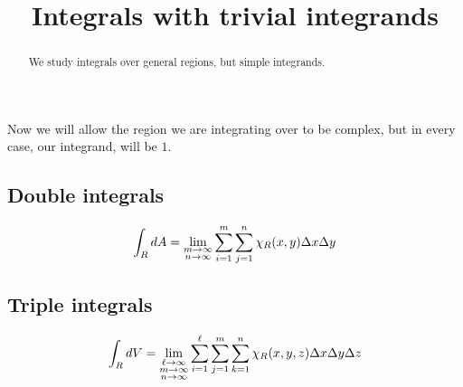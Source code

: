 \documentclass{ximera}
\title[Dig-In:]{Integrals with trivial integrands}
\begin{document}
\begin{abstract}
  We study integrals over general regions, but simple integrands.
\end{abstract}
\maketitle


Now we will allow the region we are integrating over to be complex,
but in every case, our integrand, will be $1$.

\subsection{Double integrals}


\[
\int_R \mathop{}\!d A = \lim_{\substack{m\to\infty\\ n\to\infty}}\sum_{i=1}^m\sum_{j=1}^n \chi_{R}(x,y)\Delta x \Delta y
\]

\subsection{Triple integrals}

\[
\int_R \mathop{}\!d V = \lim_{\substack{\ell\to\infty\\ m\to\infty\\ n\to\infty}}\sum_{i=1}^\ell\sum_{j=1}^m \sum_{k=1}^n\chi_{R}(x,y,z)\Delta x\Delta y \Delta z
\]
\end{document}
